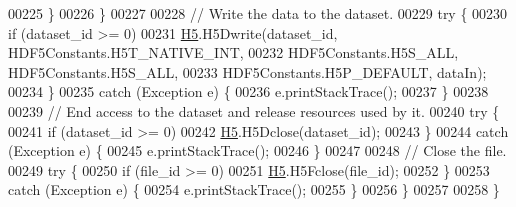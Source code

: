 \begin{DoxyCode}
00225             \}
00226         \}
00227 
00228         \textcolor{comment}{// Write the data to the dataset.}
00229         \textcolor{keywordflow}{try} \{
00230             \textcolor{keywordflow}{if} (dataset\_id >= 0)
00231                 \hyperlink{namespace_h5}{H5}.H5Dwrite(dataset\_id, HDF5Constants.H5T\_NATIVE\_INT,
00232                         HDF5Constants.H5S\_ALL, HDF5Constants.H5S\_ALL,
00233                         HDF5Constants.H5P\_DEFAULT, dataIn);
00234         \}
00235         \textcolor{keywordflow}{catch} (Exception e) \{
00236             e.printStackTrace();
00237         \}
00238 
00239         \textcolor{comment}{// End access to the dataset and release resources used by it.}
00240         \textcolor{keywordflow}{try} \{
00241             \textcolor{keywordflow}{if} (dataset\_id >= 0)
00242                 \hyperlink{namespace_h5}{H5}.H5Dclose(dataset\_id);
00243         \}
00244         \textcolor{keywordflow}{catch} (Exception e) \{
00245             e.printStackTrace();
00246         \}
00247 
00248         \textcolor{comment}{// Close the file.}
00249         \textcolor{keywordflow}{try} \{
00250             \textcolor{keywordflow}{if} (file\_id >= 0)
00251                 \hyperlink{namespace_h5}{H5}.H5Fclose(file\_id);
00252         \}
00253         \textcolor{keywordflow}{catch} (Exception e) \{
00254             e.printStackTrace();
00255         \}
00256     \}
00257 
00258 \}
\end{DoxyCode}
